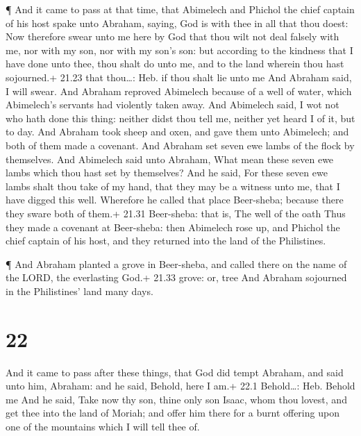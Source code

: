  ¶ And it came to pass at that time, that Abimelech and
Phichol the chief captain of his host spake unto Abraham, saying, God is
with thee in all that thou doest:  Now therefore swear unto
me here by God that thou wilt not deal falsely with me, nor with my son,
nor with my son's son: but according to the kindness that I have done
unto thee, thou shalt do unto me, and to the land wherein thou hast
sojourned.+ 21.23 that thou\ldots: Heb. if thou shalt lie unto me
 And Abraham said, I will swear.  And Abraham
reproved Abimelech because of a well of water, which Abimelech's
servants had violently taken away.  And Abimelech said, I
wot not who hath done this thing: neither didst thou tell me, neither
yet heard I of it, but to day.  And Abraham took sheep and
oxen, and gave them unto Abimelech; and both of them made a covenant.
 And Abraham set seven ewe lambs of the flock by
themselves.  And Abimelech said unto Abraham, What mean
these seven ewe lambs which thou hast set by themselves? 
And he said, For these seven ewe lambs shalt thou take of my hand, that
they may be a witness unto me, that I have digged this well.
 Wherefore he called that place Beer-sheba; because there
they sware both of them.+ 21.31 Beer-sheba: that is, The well of the
oath  Thus they made a covenant at Beer-sheba: then
Abimelech rose up, and Phichol the chief captain of his host, and they
returned into the land of the Philistines.

 ¶ And Abraham planted a grove in Beer-sheba, and called
there on the name of the LORD, the everlasting God.+ 21.33 grove: or,
tree  And Abraham sojourned in the Philistines' land many
days.

\hypertarget{section-21}{%
\section{22}\label{section-21}}

 And it came to pass after these things, that God did tempt
Abraham, and said unto him, Abraham: and he said, Behold, here I am.+
22.1 Behold\ldots: Heb. Behold me  And he said, Take now thy
son, thine only son Isaac, whom thou lovest, and get thee into the land
of Moriah; and offer him there for a burnt offering upon one of the
mountains which I will tell thee of.

